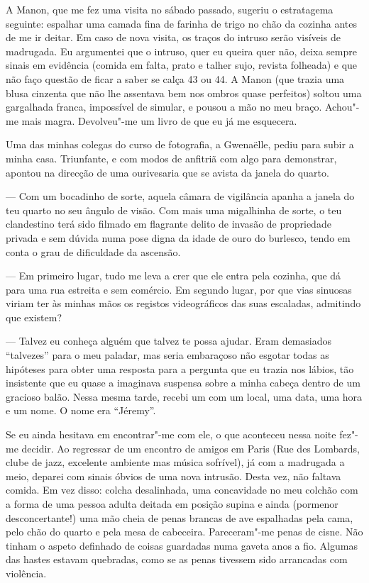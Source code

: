 A Manon, que me fez uma visita no sábado passado, sugeriu o estratagema
seguinte: espalhar uma camada fina de farinha de trigo no chão da
cozinha antes de me ir deitar. Em caso de nova visita, os traços do
intruso serão visíveis de madrugada. Eu argumentei que o intruso, quer
eu queira quer não, deixa sempre sinais em evidência (comida em falta,
prato e talher sujo, revista folheada) e que não faço questão de ficar a
saber se calça 43 ou 44. A Manon (que trazia uma blusa cinzenta que não
lhe assentava bem nos ombros quase
perfeitos) soltou uma gargalhada franca, impossível de simular, e
pousou a mão no meu braço. Achou"-me mais magra. Devolveu"-me um livro de
que eu já me esquecera.

Uma das minhas colegas do curso de fotografia, a Gwenaëlle, pediu para
subir a minha casa. Triunfante, e com modos de anfitriã com algo para
demonstrar, apontou na direcção de uma ourivesaria que se avista da
janela do quarto.

--- Com um bocadinho de sorte, aquela câmara de vigilância apanha a
  janela do teu quarto no seu ângulo de visão. Com mais uma migalhinha
  de sorte, o teu clandestino terá sido filmado em flagrante delito de
  invasão de propriedade privada e sem dúvida numa pose digna da idade
  de ouro do burlesco, tendo em conta o grau de dificuldade da ascensão.

--- Em primeiro lugar, tudo me leva a crer que ele entra pela cozinha, que
  dá para uma rua estreita e sem comércio. Em segundo lugar, por que
  vias sinuosas viriam ter às minhas mãos os registos videográficos das
  suas escaladas, admitindo que existem?

--- Talvez eu conheça alguém que talvez te possa ajudar. Eram demasiados
``talvezes'' para o meu paladar, mas seria embaraçoso não esgotar
todas as hipóteses para obter uma resposta
para a pergunta que eu trazia nos lábios, tão insistente que eu quase
a imaginava suspensa sobre a minha cabeça dentro de um gracioso balão.
Nessa mesma tarde, recebi um  com um local, uma data, uma hora e um
nome. O nome era ``Jéremy''.

Se eu ainda hesitava em encontrar"-me com ele, o que aconteceu nessa
noite fez"-me decidir. Ao regressar de um encontro de amigos em Paris
(Rue des Lombards, clube de jazz, excelente ambiente mas música
sofrível), já com a madrugada a meio, deparei com sinais óbvios de uma
nova
intrusão. Desta vez, não faltava comida. Em vez disso: colcha
desalinhada, uma concavidade no meu colchão com a forma de uma pessoa
adulta deitada em posição supina e ainda (pormenor desconcertante!)
uma mão cheia de penas brancas de ave espalhadas pela cama, pelo chão do
quarto e pela mesa de cabeceira. Pareceram"-me penas de cisne. Não tinham
o aspeto definhado de coisas guardadas numa gaveta anos a fio. Algumas
das hastes estavam quebradas, como se as penas tivessem sido arrancadas
com violência.

